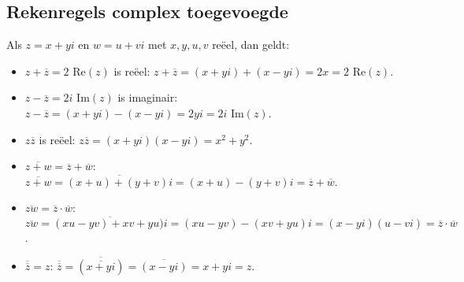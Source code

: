 \subsection{Rekenregels complex toegevoegde}
Als $z = x +yi$ en $w = u + vi$ met $x, y, u, v$ re\"eel, dan geldt:
\begin{itemize}
	\item $z + \overline{z} = 2 \mbox{ Re}(z)$ is re\"eel: $z+\overline{z} = (x + yi) + (x-yi) = 2x = 2 \mbox{ Re}(z)$.
	\item $z - \overline{z} = 2i \mbox{ Im}(z)$ is imaginair: $z-\overline{z} = (x+yi) - (x-yi) = 2yi = 2i \mbox{ Im}(z)$.
	\item $z \overline{z}$ is re\"eel: $z\overline{z} = (x+yi)(x-yi) = x^2 + y^2$.
	\item $\overline{z+w} = \overline{z} + \overline{w}$: $\overline{z+w} = \overline{(x+u) + (y+v)i} = (x+u)-(y+v)i = \overline{z} + \overline{w}$.
	\item $\overline{zw} = \overline{z} \cdot \overline{w}$: $\overline{zw} = \overline{(xu-yv)+xv+yu)i} = (xu -yv) - (xv+yu)i = (x-yi)(u-vi) = \overline{z} \cdot \overline{w}$.
	\item $\overline{\overline{z}} = z$: $\overline{\overline{z}} = \overline{(\overline{x+yi})} = \overline{(x-yi)} = x+yi = z$.
\end{itemize}